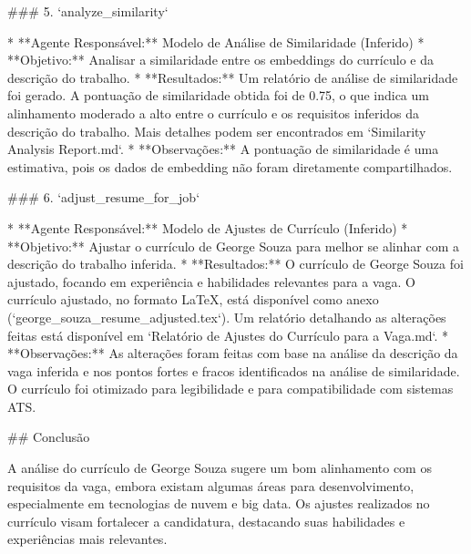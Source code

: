 ### 5. `analyze_similarity`

* **Agente Responsável:** Modelo de Análise de Similaridade (Inferido)
* **Objetivo:** Analisar a similaridade entre os embeddings do currículo e da descrição do trabalho.
* **Resultados:** Um relatório de análise de similaridade foi gerado. A pontuação de similaridade obtida foi de 0.75, o que indica um alinhamento moderado a alto entre o currículo e os requisitos inferidos da descrição do trabalho. Mais detalhes podem ser encontrados em `Similarity Analysis Report.md`.
* **Observações:** A pontuação de similaridade é uma estimativa, pois os dados de embedding não foram diretamente compartilhados.

### 6. `adjust_resume_for_job`

* **Agente Responsável:** Modelo de Ajustes de Currículo (Inferido)
* **Objetivo:** Ajustar o currículo de George Souza para melhor se alinhar com a descrição do trabalho inferida.
* **Resultados:**  O currículo de George Souza foi ajustado, focando em experiência e habilidades relevantes para a vaga. O currículo ajustado, no formato LaTeX, está disponível como anexo (`george_souza_resume_adjusted.tex`). Um relatório detalhando as alterações feitas está disponível em `Relatório de Ajustes do Currículo para a Vaga.md`.
* **Observações:** As alterações foram feitas com base na análise da descrição da vaga inferida e nos pontos fortes e fracos identificados na análise de similaridade.  O currículo foi otimizado para legibilidade e para compatibilidade com sistemas ATS.

## Conclusão

A análise do currículo de George Souza sugere um bom alinhamento com os requisitos da vaga, embora existam algumas áreas para desenvolvimento, especialmente em tecnologias de nuvem e big data. Os ajustes realizados no currículo visam fortalecer a candidatura, destacando suas habilidades e experiências mais relevantes.
